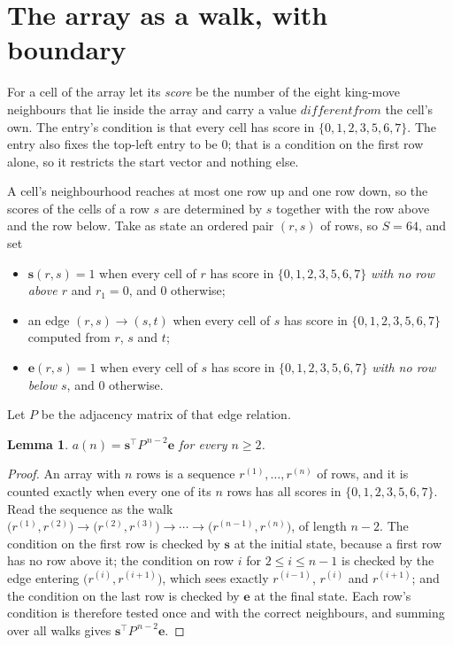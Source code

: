 \documentclass[11pt,a4paper]{article}
\theoremstyle{plain}
\newtheorem{lemma}[theorem]{Lemma}
\theoremstyle{definition}
\begin{document}
\section{The array as a walk, with boundary}

For a cell of the array let its \emph{score} be the number of the eight king-move neighbours that lie inside
the array and carry a value $different from$ the cell's own. The entry's condition is that every cell
has score in $\{0,1,2,3,5,6,7\}$. The entry also fixes the top-left entry to be $0$; that is a condition on the first row alone, so it restricts the start vector and nothing else.

A cell's neighbourhood reaches at most one row up and one row down, so the scores of the
cells of a row $s$ are determined by $s$ together with the row above and the row below.
Take as state an ordered pair $(r,s)$ of rows, so $S=64$, and set
\begin{itemize}
\item $\mathbf{s}(r,s)=1$ when every cell of $r$ has score in $\{0,1,2,3,5,6,7\}$ \emph{with no row
above $r$} and $r_1=0$, and $0$ otherwise;
\item an edge $(r,s)\to(s,t)$ when every cell of $s$ has score in $\{0,1,2,3,5,6,7\}$ computed from
$r$, $s$ and $t$;
\item $\mathbf{e}(r,s)=1$ when every cell of $s$ has score in $\{0,1,2,3,5,6,7\}$ \emph{with no row
below $s$}, and $0$ otherwise.
\end{itemize}
Let $P$ be the adjacency matrix of that edge relation.

\begin{lemma}\label{lem:walk}
$a(n)=\mathbf{s}^{\!\top}P^{\,n-2}\mathbf{e}$ for every $n\ge2$.
\end{lemma}

\begin{proof}
An array with $n$ rows is a sequence $r^{(1)},\dots,r^{(n)}$ of rows, and it is counted
exactly when every one of its $n$ rows has all scores in $\{0,1,2,3,5,6,7\}$. Read the sequence as the
walk $\bigl(r^{(1)},r^{(2)}\bigr)\to\bigl(r^{(2)},r^{(3)}\bigr)\to\cdots\to
\bigl(r^{(n-1)},r^{(n)}\bigr)$, of length $n-2$. The condition on the first row is
checked by $\mathbf{s}$ at the initial state, because a first row has no row above it; the
condition on row $i$ for $2\le i\le n-1$ is checked by the edge entering
$\bigl(r^{(i)},r^{(i+1)}\bigr)$, which sees exactly $r^{(i-1)}$, $r^{(i)}$ and
$r^{(i+1)}$; and the condition on the last row is checked by $\mathbf{e}$ at the final
state. Each row's condition is therefore tested once and with the correct neighbours, and
summing over all walks gives $\mathbf{s}^{\!\top}P^{\,n-2}\mathbf{e}$.
\end{proof}
\end{document}
